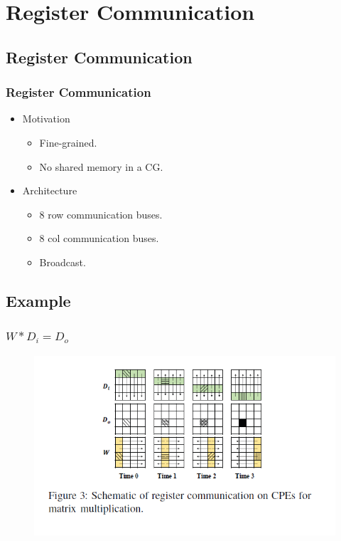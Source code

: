 \section{Register Communication}

\subsection{Register Communication}
\begin{frame}
    \frametitle{Register Communication}
	\begin{itemize}
		\item Motivation
		\begin{itemize}
			\item Fine-grained.
			\item No shared memory in a CG.
		\end{itemize}
		\item Architecture
		\begin{itemize}
			\item 8 row communication buses.
			\item 8 col communication buses.
			\item Broadcast. 
		\end{itemize}
	\end{itemize} 
\end{frame}
\subsection{Example}
\begin{frame}
	\frametitle{$W*D_{i}=D_{o}$}
	\begin{figure}
		\includegraphics[scale=0.5]{figure/broadcast.PNG}
	\end{figure}
\end{frame}



	

